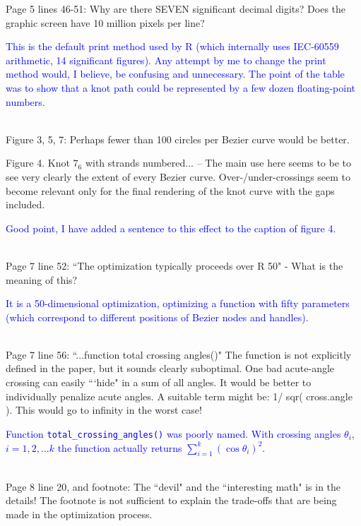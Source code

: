 \documentclass[12pt]{article}
\begin{document}
Page 5 lines 46-51: Why are there SEVEN significant decimal digits?
Does the graphic screen have 10 million pixels per line?

\textcolor{blue}{This is the default print method used by R (which
  internally uses IEC-60559 arithmetic, 14 significant figures).  Any
  attempt by me to change the print method would, I believe, be
  confusing and unnecessary.  The point of the table was to show that
  a knot path could be represented by a few dozen floating-point
  numbers.\\ \\}

Figure 3, 5, 7: Perhaps fewer than 100 circles per Bezier curve would
be better.


Figure 4.  Knot $7_6$ with strands numbered... -- The main use here seems
to be to see very clearly the extent of every Bezier curve.
Over-/under-crossings seem to become relevant only for the final
rendering of the knot curve with the gaps included.

\textcolor{blue}{Good point, I have added a sentence to this effect to
  the caption of figure 4.\\ \\}

Page 7 line 52: ``The optimization typically proceeds over R 50" - What
is the meaning of this?

\textcolor{blue}{It is a 50-dimensional optimization, optimizing a
  function with fifty parameters (which correspond to different
  positions of Bezier nodes and handles).\\ \\}

Page 7 line 56: ``...function total crossing angles()" The function is
not explicitly defined in the paper, but it sounds clearly suboptimal.
One bad acute-angle crossing can easily ```hide" in a sum of all angles.
It would be better to individually penalize acute angles.  A suitable
term might be: 1/ sqr( cross.angle ).  This would go to infinity in
the worst case!

\textcolor{blue}{Function {\tt total\_crossing\_angles()} was poorly
  named.  With crossing angles $\theta_i$, $i=1,2,\ldots k$ the
  function actually returns $\sum_{i=1}^k\left(\cos\theta_i\right)^2$.
  \\ \\}

Page 8 line 20, and footnote: The ``devil" and the ``interesting math"
is in the details!  The footnote is not sufficient to explain the
trade-offs that are being made in the optimization process.
\end{document}
